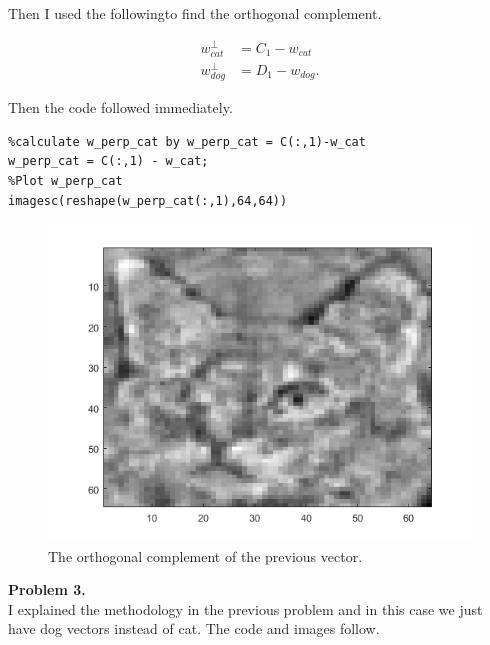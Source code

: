 \documentclass[leqno]{article}
\theoremstyle{nonumberplain}
\begin{document}
Then I used the followingto find the orthogonal complement. 

\begin{align*}
w_{cat}^\perp &= C_1-w_{cat}\\
w_{dog}^\perp &= D_1-w_{dog}.
\end{align*}

Then the code followed immediately.

\begin{lstlisting}
%calculate w_perp_cat by w_perp_cat = C(:,1)-w_cat
w_perp_cat = C(:,1) - w_cat;
%Plot w_perp_cat
imagesc(reshape(w_perp_cat(:,1),64,64))
\end{lstlisting}

\begin{figure}[h]
\begin{center}
\includegraphics[scale=.4]{w_perp_cat.png}
\caption{The orthogonal complement of the previous vector.}
\end{center}
\end{figure}

\pagebreak



\noindent\textbf{Problem 3.} \\
I explained the methodology in the previous problem and in this case we just have dog vectors instead of cat. The code and images follow.
\end{document}

